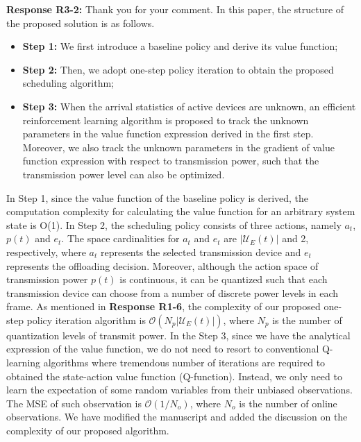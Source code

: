 \documentclass[12pt,onecolumn]{IEEEtran}
\newcommand{\blue}{\color{blue}}
\begin{document}
{\blue \textbf{Response R3-2:} Thank you for your comment. In this paper, the structure of the proposed solution is as follows. 
\begin{itemize}
\item \textbf{Step 1:} We first introduce a baseline policy and derive its value function;
\item \textbf{Step 2:} Then, we adopt one-step policy iteration to obtain the proposed scheduling algorithm;
\item \textbf{Step 3:} When the arrival statistics of active devices are unknown, an efficient reinforcement learning algorithm is proposed to track the unknown parameters in the value function expression derived in the first step. Moreover, we also track the unknown parameters in the gradient of value function expression with respect to transmission power, such that the transmission power level can also be optimized.
\end{itemize}

In Step 1, since the value function of the baseline policy is derived, the computation complexity for calculating the value function for an arbitrary system state is O(1). In Step 2, the scheduling policy consists of three actions, namely $a_t$, $p(t)$ and $e_t$. The space cardinalities for $a_t$ and $e_t$ are $|\mathcal U_E(t)|$ and 2, respectively, where $a_t$ represents the selected transmission device and $e_t$ represents the offloading decision. Moreover, although the action space of transmission power $p(t)$ is continuous, it can be quantized such that each transmission device can choose from a number of discrete power levels in each frame. As mentioned in \textbf{Response R1-6}, the complexity of our proposed one-step policy iteration algorithm is $\mathcal O(N_p|\mathcal U_E(t)|)$, where $N_p$ is the number of quantization levels of transmit power. In the Step 3, since we have the analytical expression of the value function, we do not need to resort to conventional Q-learning algorithms where tremendous number of iterations are required to obtained the state-action value function (Q-function). Instead, we only need to learn the expectation of some random variables from their unbiased observations. The MSE of such observation is $\mathcal O(1/N_o)$, where $N_o$ is the number of online observations. We have modified the manuscript and added the discussion on the complexity of our proposed algorithm.
}
\end{document}
